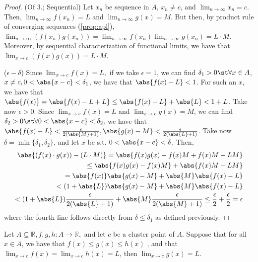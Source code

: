 \documentclass[12pt]{article}
\renewcommand{\qedsymbol}{\Libra}
\begin{document}
\begin{proof}(Of 3.; Sequential) Let $x_n$ be sequence in $A$, $x_n \neq c$, and $\lim_{n\to \infty} x_n = c$. Then, $\lim_{n\to\infty} f(x_n) = L$ and $\lim_{n \to \infty} g(x) = M$. But then, by product rule of converging sequences (\cref{prop:apl}), $\lim_{n\to\infty} (f(x_n)g(x_n)) = \lim_{n\to\infty} f(x_n) \lim_{n\to\infty}g(x_n) = L \cdot M$. Moreover, by sequential characterization of functional limits, we have that $\lim_{x \to c} (f(x)g(x)) = L \cdot M$.$\quad$ \qedsymbol

\noindent($\epsilon-\delta$) Since $\lim_{x\to c}f(x) = L,$ if we take $\epsilon = 1$, we can find $\delta_1 > 0 \st \forall x \in A$, $x \neq c, 0 < \abs{x - c} < \delta_1$, we have that $\abs{f(x) - L} < 1$. For such an $x$, we have that $\abs{f(x)} = \abs{f(x) - L + L} \leq \abs{f(x) - L} + \abs{L} < 1 + L$. Take now $\epsilon > 0$. Since $\lim_{x\to c} f(x) = L$ and $\lim_{x\to c} g(x) = M$, we can find $\delta_2 > 0 \st \forall 0 < \abs{x - c} < \delta_2,$ we have that $\abs{f(x) - L} < \frac{\epsilon}{2(\abs{M} +1)}, \abs{g(x) - M} < \frac{\epsilon}{2 (\abs{L} + 1)}$. Take now $\delta = \min\{\delta_1, \delta_2\}$, and let $x$ be s.t. $0 < \abs{x - c} < \delta$. Then, \begin{align*}
  \abs{(f(x)\cdot g(x)) - (L\cdot M)} = \abs{f(x)g(x) - f(x)M + f(x)M - LM} \\
  \leq \abs{f(x) g(x) - f(x)M} + \abs{f(x)M - LM}\\
  = \abs{f(x)}\abs{g(x) - M} + \abs{M}\abs{f(x) - L}\\
  < (1 + \abs{L})\abs{g(x) - M} + \abs{M}\abs{f(x) - L}\\
  < (1+\abs{L})\frac{\epsilon}{2(\abs{L}+1)} + \abs{M} \frac{\epsilon}{2(\abs{M}+1)} \leq \frac{\epsilon}{2} + \frac{\epsilon}{2} = \epsilon
\end{align*}
where the fourth line follows directly from $\delta \leq \delta_1$ as defined previously.
\end{proof}

\begin{theorem}\label{thm:functionalsqueeze}
  Let $A \subseteq \mathbb{R},f,g,h : A \to \mathbb{R},$ and let $c$ be a cluster point of $A$. Suppose that for all $x \in A$, we have that $f(x) \leq g(x) \leq h(x)$ , and that $\lim_{x\to c} f(x) = \lim_{x \to c} h(x) = L$, then $\lim_{x\to c} g(x) = L$.
\end{theorem}
\end{document}

